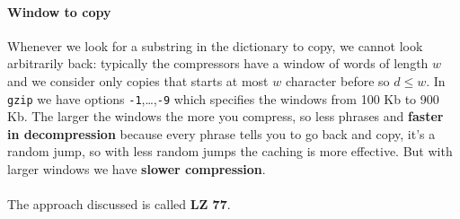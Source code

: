 \documentclass[10pt]{report}
\begin{document}
\paragraph{Window to copy} Whenever we look for a substring in the dictionary to copy, we cannot look arbitrarily back: typically the compressors have a window of words of length $w$ and we consider only copies that starts at most $w$ character before so $d\leq w$. In \texttt{gzip} we have options \texttt{-1},\ldots,\texttt{-9} which specifies the windows from 100 Kb to 900 Kb. The larger the windows the more you compress, so less phrases and \textbf{faster in decompression} because every phrase tells you to go back and copy, it's a random jump, so with less random jumps the caching is more effective. But with larger windows we have \textbf{slower compression}.\\\\
The approach discussed is called \textbf{LZ 77}.
\end{document}
